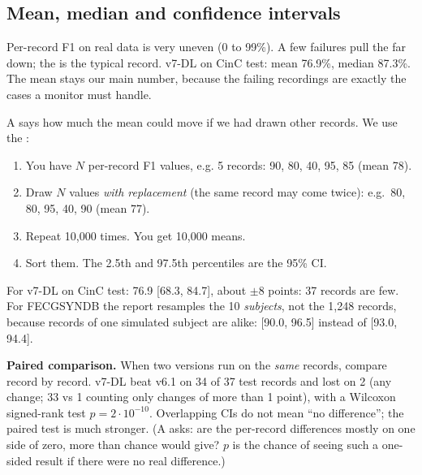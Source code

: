 \documentclass[11pt]{article}
\begin{document}
\subsection{Mean, median and confidence intervals}
Per-record F1 on real data is very uneven (0 to 99\%). A few failures pull the  far down; the  is the typical record. v7-DL on CinC test: mean 76.9\%, median 87.3\%. The mean stays our main number, because the failing recordings are exactly the cases a monitor must handle.

A  says how much the mean could move if we had drawn other records. We use the :
\begin{simple}
\begin{enumerate}
  \item You have $N$ per-record F1 values, e.g. 5 records: 90, 80, 40, 95, 85 (mean 78).
  \item Draw $N$ values \emph{with replacement} (the same record may come twice): e.g.\ 80, 80, 95, 40, 90 (mean 77).
  \item Repeat 10,000 times. You get 10,000 means.
  \item Sort them. The 2.5th and 97.5th percentiles are the 95\% CI.
\end{enumerate}
\end{simple}
For v7-DL on CinC test: 76.9 [68.3, 84.7], about $\pm 8$ points: 37 records are few. For FECGSYNDB the report resamples the 10 \emph{subjects}, not the 1,248 records, because records of one simulated subject are alike: [90.0, 96.5] instead of [93.0, 94.4].

\textbf{Paired comparison.} When two versions run on the \emph{same} records, compare record by record. v7-DL beat v6.1 on 34 of 37 test records and lost on 2 (any change; 33 vs 1 counting only changes of more than 1 point), with a Wilcoxon signed-rank test $p = 2\cdot 10^{-10}$. Overlapping CIs do not mean ``no difference''; the paired test is much stronger. (A  asks: are the per-record differences mostly on one side of zero, more than chance would give? $p$ is the chance of seeing such a one-sided result if there were no real difference.)
\end{document}
